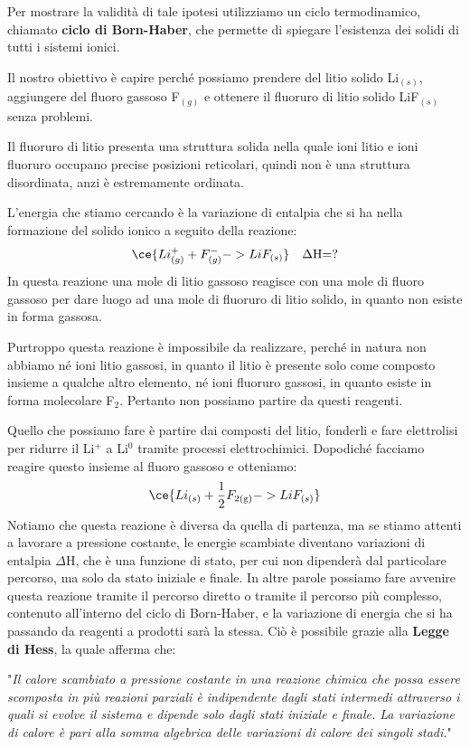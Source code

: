 Per mostrare la validità di tale ipotesi utilizziamo un ciclo termodinamico, chiamato \textbf{ciclo di Born-Haber}, che permette di spiegare l'esistenza dei solidi di tutti i sistemi ionici.

Il nostro obiettivo è capire perché possiamo prendere del litio solido Li$_{(s)}$, aggiungere del fluoro gassoso F$_{(g)}$ e ottenere il fluoruro di litio solido LiF$_{(s)}$ senza problemi.

Il fluoruro di litio presenta una struttura solida nella quale ioni litio e ioni fluoruro occupano precise posizioni reticolari, quindi non è una struttura disordinata, anzi è estremamente ordinata.

L'energia che stiamo cercando è la variazione di entalpia che si ha nella formazione del solido ionico a seguito della reazione:
$$\ce{Li^{+}_{(g)} + F^{-}_{(g)} -> LiF_{(s)}} \quad \Delta\text{H=?}$$
In questa reazione una mole di litio gassoso reagisce con una mole di fluoro gassoso per dare luogo ad una mole di fluoruro di litio solido, in quanto non esiste in forma gassosa.

Purtroppo questa reazione è impossibile da realizzare, perché in natura non abbiamo né ioni litio gassosi, in quanto il litio è presente solo come composto insieme a qualche altro elemento, né ioni fluoruro gassosi, in quanto esiste in forma molecolare F$_2$. Pertanto non possiamo partire da questi reagenti.

Quello che possiamo fare è partire dai composti del litio, fonderli e fare elettrolisi per ridurre il Li$^+$ a Li$^0$ tramite processi elettrochimici. Dopodiché facciamo reagire questo insieme al fluoro gassoso e otteniamo:
$$\ce{Li_{(s)} + \frac{1}{2}F_{2(\text{g})} -> LiF_{(s)}}$$
Notiamo che questa reazione è diversa da quella di partenza, ma se stiamo attenti a lavorare a pressione costante, le energie scambiate diventano variazioni di entalpia $\Delta$H, che è una funzione di stato, per cui non dipenderà dal particolare percorso, ma solo da stato iniziale e finale. In altre parole possiamo fare avvenire questa reazione tramite il percorso diretto o tramite il percorso più complesso, contenuto all'interno del ciclo di Born-Haber, e la variazione di energia che si ha passando da reagenti a prodotti sarà la stessa. Ciò è possibile grazie alla \textbf{Legge di Hess}, la quale afferma che:

\vspace{0.2cm}"\textit{Il calore scambiato a pressione costante in una reazione chimica che possa essere scomposta in più reazioni parziali è indipendente dagli stati intermedi attraverso i quali si evolve il sistema e dipende solo dagli stati iniziale e finale. La variazione di calore è pari alla somma algebrica delle variazioni di calore dei singoli stadi.}"

